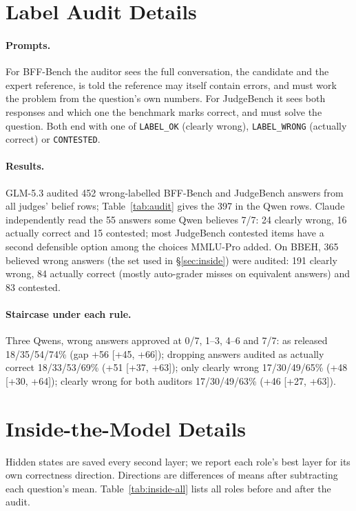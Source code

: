 \documentclass[11pt]{article}
\begin{document}
\section{Label Audit Details}
\label{app:audit}

\paragraph{Prompts.} For BFF-Bench the auditor sees the full conversation, the candidate and the expert reference,
is told the reference may itself contain errors, and must work the problem from the question's own numbers. For
JudgeBench it sees both responses and which one the benchmark marks correct, and must solve the question. Both end
with one of \texttt{LABEL\_OK} (clearly wrong), \texttt{LABEL\_WRONG} (actually correct) or \texttt{CONTESTED}.

\paragraph{Results.} GLM-5.3 audited 452 wrong-labelled BFF-Bench and JudgeBench answers from all judges'
belief rows; Table~\ref{tab:audit} gives the 397 in the Qwen rows. Claude independently read the 55 answers some Qwen
believes 7/7: 24 clearly wrong, 16 actually correct and 15 contested; most JudgeBench contested items have a second
defensible option among the choices MMLU-Pro added. On BBEH, 365 believed wrong answers (the set used in
\S\ref{sec:inside}) were audited: 191 clearly wrong, 84 actually correct (mostly auto-grader misses on equivalent
answers) and 83 contested.

\paragraph{Staircase under each rule.} Three Qwens, wrong answers approved at 0/7, 1--3, 4--6 and 7/7: as released
18/35/54/74\% (gap +56 [+45, +66]); dropping answers audited as actually correct 18/33/53/69\% (+51 [+37, +63]); only
clearly wrong 17/30/49/65\% (+48 [+30, +64]); clearly wrong for both auditors 17/30/49/63\% (+46 [+27, +63]).

\section{Inside-the-Model Details}
\label{app:inside}

Hidden states are saved every second layer; we report each role's best layer for its own correctness direction.
Directions are differences of means after subtracting each question's mean. Table~\ref{tab:inside-all} lists all
roles before and after the audit.
\end{document}
